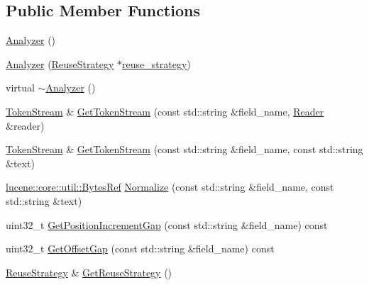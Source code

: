 \subsection*{Public Member Functions}
\begin{DoxyCompactItemize}
\item 
\mbox{\hyperlink{classlucene_1_1core_1_1analysis_1_1Analyzer_a1be2ff17bba265bdef6e1b44748eaf96}{Analyzer}} ()
\item 
\mbox{\hyperlink{classlucene_1_1core_1_1analysis_1_1Analyzer_ae9dc5c7b575e336b14185cf403003bba}{Analyzer}} (\mbox{\hyperlink{classlucene_1_1core_1_1analysis_1_1Analyzer_1_1ReuseStrategy}{Reuse\+Strategy}} $\ast$\mbox{\hyperlink{classlucene_1_1core_1_1analysis_1_1Analyzer_a8c0924436e0392015b0b3df59d35717c}{reuse\+\_\+strategy}})
\item 
virtual \mbox{\hyperlink{classlucene_1_1core_1_1analysis_1_1Analyzer_afa899ac3a6aabbe59f791f69368ad740}{$\sim$\+Analyzer}} ()
\item 
\mbox{\hyperlink{classlucene_1_1core_1_1analysis_1_1TokenStream}{Token\+Stream}} \& \mbox{\hyperlink{classlucene_1_1core_1_1analysis_1_1Analyzer_a010cdb318b51c27c46b8cbf5a1cfe20e}{Get\+Token\+Stream}} (const std\+::string \&field\+\_\+name, \mbox{\hyperlink{classlucene_1_1core_1_1analysis_1_1Reader}{Reader}} \&reader)
\item 
\mbox{\hyperlink{classlucene_1_1core_1_1analysis_1_1TokenStream}{Token\+Stream}} \& \mbox{\hyperlink{classlucene_1_1core_1_1analysis_1_1Analyzer_a385dbda39ff79997402b35ddbb296697}{Get\+Token\+Stream}} (const std\+::string \&field\+\_\+name, const std\+::string \&text)
\item 
\mbox{\hyperlink{classlucene_1_1core_1_1util_1_1BytesRef}{lucene\+::core\+::util\+::\+Bytes\+Ref}} \mbox{\hyperlink{classlucene_1_1core_1_1analysis_1_1Analyzer_aff90a96fce2aa5ab99c6c2a880849812}{Normalize}} (const std\+::string \&field\+\_\+name, const std\+::string \&text)
\item 
uint32\+\_\+t \mbox{\hyperlink{classlucene_1_1core_1_1analysis_1_1Analyzer_a97cced949f5cfd3e4527b82fc178fa42}{Get\+Position\+Increment\+Gap}} (const std\+::string \&field\+\_\+name) const
\item 
uint32\+\_\+t \mbox{\hyperlink{classlucene_1_1core_1_1analysis_1_1Analyzer_af535ad197952fbf88c74e4298bb6a9f1}{Get\+Offset\+Gap}} (const std\+::string \&field\+\_\+name) const
\item 
\mbox{\hyperlink{classlucene_1_1core_1_1analysis_1_1Analyzer_1_1ReuseStrategy}{Reuse\+Strategy}} \& \mbox{\hyperlink{classlucene_1_1core_1_1analysis_1_1Analyzer_afbf37ccc45ae5a78ef6f9399ac484c64}{Get\+Reuse\+Strategy}} ()

\end{DoxyCompactItemize}
